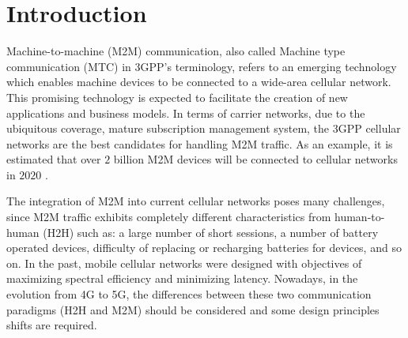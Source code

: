 \section{Introduction}
Machine-to-machine (M2M) communication, also called Machine type communication (MTC) in 3GPP's terminology, refers to an emerging technology which enables machine devices to be connected to a wide-area cellular network. This promising technology is expected to facilitate the creation of new applications and business models. In terms of carrier networks, due to the ubiquitous coverage, mature subscription management system, the 3GPP cellular networks are the best candidates for handling M2M traffic. As an example, it is estimated that over $2$ billion M2M devices will be connected to cellular networks in $2020$ \cite{Eri11}.

The integration of M2M into current cellular networks poses many challenges, since M2M traffic exhibits completely different characteristics from human-to-human (H2H) such as: a large number of short sessions, a number of battery operated devices, difficulty of replacing or recharging batteries for devices, and so on. In the past, mobile cellular networks were designed with objectives of maximizing spectral efficiency and minimizing latency. Nowadays, in the evolution from 4G to 5G, the differences between these two communication paradigms (H2H and M2M) should be considered and some design principles shifts are required.   

